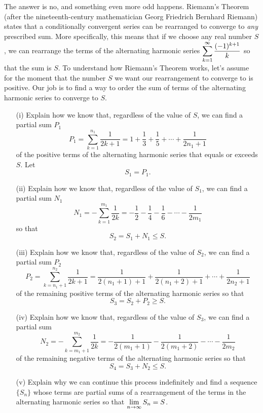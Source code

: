 \begin{exercises}
 The answer is no, and something even more odd happens. Riemann's Theorem (after the nineteenth-century mathematician Georg Friedrich Bernhard Riemann) states that a conditionally convergent series can be rearranged to converge to \emph{any} prescribed sum. More specifically, this means that if we choose any real number $S$, we can rearrange the terms of the alternating harmonic series $\displaystyle \sum_{k=1}^{\infty} \frac{(-1)^{k+1}}{k}$ so that the sum is $S$. To understand how Riemann's Theorem works, let's assume for the moment that the number $S$ we want our rearrangement to converge to is positive. Our job is to find a way to order the sum of terms of the alternating harmonic series to converge to $S$.
    \begin{itemize}
    \item[(i)] Explain how we know that, regardless of the value of $S$, we can find a partial sum $P_1$ 
    \[P_1 = \sum_{k=1}^{n_1} \frac{1}{2k+1} = 1 + \frac{1}{3} + \frac{1}{5} + \cdots + \frac{1}{2n_1+1}\]
    of the positive terms of the alternating harmonic series that equals or exceeds $S$. Let
    \[S_1 = P_1.\]

    \item[(ii)] Explain how we know that, regardless of the value of $S_1$, we can find a partial sum $N_1$
    \[N_1 = -\sum_{k=1}^{m_1} \frac{1}{2k} = -\frac{1}{2} - \frac{1}{4} - \frac{1}{6} - \cdots - \frac{1}{2m_1}\]
    so that
    \[S_2 = S_1 + N_1 \leq S.\]

    \item[(iii)] Explain how we know that, regardless of the value of $S_2$, we can find a partial sum $P_2$
    \[P_2 = \sum_{k=n_1+1}^{n_2} \frac{1}{2k+1} = \frac{1}{2(n_1+1)+1} + \frac{1}{2(n_1+2)+1} + \cdots + \frac{1}{2n_2+1}\]
    of the remaining positive terms of the alternating harmonic series so that
    \[S_3 = S_2 + P_2 \geq S.\]

    \item[(iv)] Explain how we know that, regardless of the value of $S_3$, we can find a partial sum
    \[N_2 = -\sum_{k=m_1+1}^{m_2} \frac{1}{2k} = -\frac{1}{2(m_1+1)} - \frac{1}{2(m_1+2)} - \cdots - \frac{1}{2m_2}\]
     of the remaining negative terms of the alternating harmonic series so that
    \[S_4 = S_3 + N_2 \leq S.\]

    \item[(v)] Explain why we can continue this process indefinitely and find a sequence $\{S_n\}$ whose terms are partial sums of a rearrangement of the terms in the alternating harmonic series so that $\displaystyle \lim_{n \to \infty} S_n = S$.


    \end{itemize}

 \ea





\end{exercises}


\afterexercises
